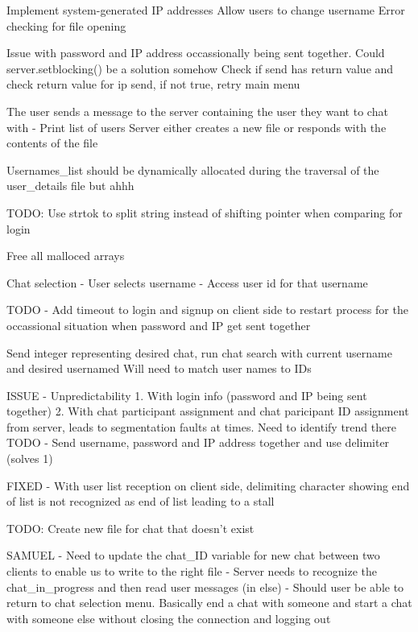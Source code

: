 Implement system-generated IP addresses
Allow users to change username
Error checking for file opening

Issue with password and IP address occassionally being sent together. 
    Could server.setblocking() be a solution somehow
    Check if send has return value and check return value for ip send, if not true, retry main menu

The user sends a message to the server containing the user they want to chat with
 - Print list of users 
Server either creates a new file or responds with the contents of the file    

Usernames_list should be dynamically allocated during the traversal of the user_details file but ahhh

TODO: Use strtok to split string instead of shifting pointer when comparing for login

Free all malloced arrays

Chat selection 
- User selects username 
- Access user id for that username

TODO - Add timeout to login and signup on client side to restart process for the occassional situation when password and IP get sent together

Send integer representing desired chat, run chat search with current username and desired usernamed
Will need to match user names to IDs 

ISSUE - Unpredictability 
1. With login info (password and IP being sent together)
2. With chat participant assignment and chat paricipant ID assignment from server, leads to segmentation faults at times. Need to identify trend there
TODO - Send username, password and IP address together and use delimiter (solves 1)


 FIXED - With user list reception on client side, delimiting character showing end of list is not recognized as end of list leading to a stall

TODO: Create new file for chat that doesn't exist

SAMUEL 
- Need to update the chat_ID variable for new chat between two clients to enable us to write to the right file
- Server needs to recognize the chat_in_progress and then read user messages (in else)
- Should user be able to return to chat selection menu. Basically end a chat with someone and start a chat with someone else without closing the connection and logging out
